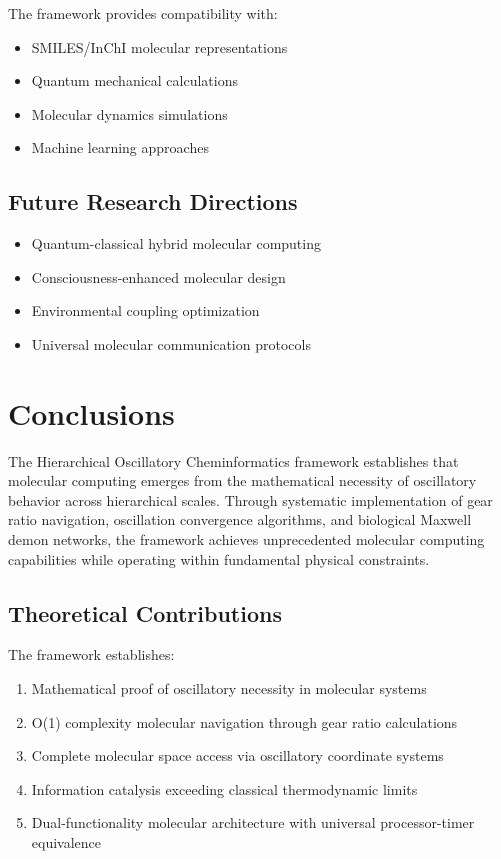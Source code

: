 \documentclass[12pt,a4paper]{article}
\begin{document}
The framework provides compatibility with:
\begin{itemize}
\item SMILES/InChI molecular representations
\item Quantum mechanical calculations
\item Molecular dynamics simulations
\item Machine learning approaches
\end{itemize}

\subsection{Future Research Directions}

\begin{itemize}
\item Quantum-classical hybrid molecular computing
\item Consciousness-enhanced molecular design
\item Environmental coupling optimization
\item Universal molecular communication protocols
\end{itemize}

\section{Conclusions}

The Hierarchical Oscillatory Cheminformatics framework establishes that molecular computing emerges from the mathematical necessity of oscillatory behavior across hierarchical scales. Through systematic implementation of gear ratio navigation, oscillation convergence algorithms, and biological Maxwell demon networks, the framework achieves unprecedented molecular computing capabilities while operating within fundamental physical constraints.

\subsection{Theoretical Contributions}

The framework establishes:
\begin{enumerate}
\item Mathematical proof of oscillatory necessity in molecular systems
\item O(1) complexity molecular navigation through gear ratio calculations
\item Complete molecular space access via oscillatory coordinate systems
\item Information catalysis exceeding classical thermodynamic limits
\item Dual-functionality molecular architecture with universal processor-timer equivalence
\end{enumerate}
\end{document}
